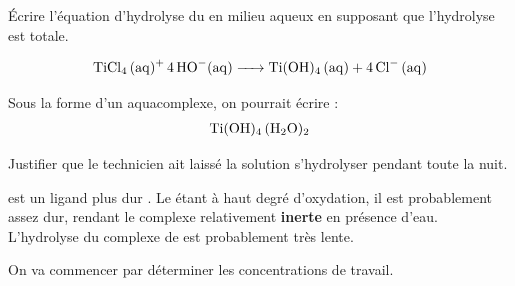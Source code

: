 \documentclass[twoside,a4paper,11pt,addpoints]{exam}%
\newcounter{foo} %
\begin{document}
\begin{questions}
\setcounter{question}{\thefoo}

\question[1] Écrire l'équation d'hydrolyse du  en milieu aqueux en supposant que l'hydrolyse est totale.

\begin{mybox}
\begin{solution}[5cm]
\begin{align*}
\ce{TiCl4 (aq)+ 4 HO^-(aq) -> Ti(OH)4 (aq) + 4 Cl^- (aq)}
\end{align*}

Sous la forme d'un aquacomplexe, on pourrait écrire : 
\begin{align*}
   \ce{Ti(OH)_4 (H2O)_2}
\end{align*}

\end{solution}
\end{mybox}


\question[2] Justifier que le technicien ait laissé la solution s'hydrolyser pendant toute la nuit.

\begin{mybox}
\begin{solution}[5cm]

 est un ligand plus dur . Le  étant à haut degré d'oxydation, il est probablement assez dur, rendant le complexe relativement \textbf{inerte} en présence d'eau.  L'hydrolyse du complexe de  est probablement très lente.
\end{solution}
\end{mybox}

\question On va commencer par déterminer les concentrations de travail.

\end{questions}
\end{document}
